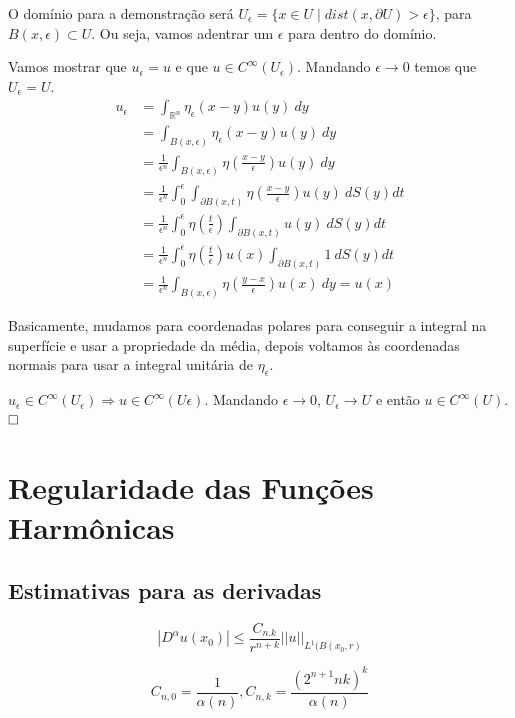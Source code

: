 \documentclass[11pt]{article}
\newcommand{\qed}{$\hfill\square$}
\newcommand{\Rn}{{\mathbb{R}^n}}
\newcommand{\p}{\partial}
\newcommand{\e}{\epsilon}
\begin{document}
O domínio para a demonstração será \( U_\e = \{x \in U \mid dist(x, \p U) > \e\} \), para \( B(x,\e) \subset U \). Ou seja, vamos adentrar um \( \e \) para dentro do domínio.

Vamos mostrar que \( u_\e=u \) e que \( u \in C^\infty(U_\e) \). Mandando \( \e \rightarrow 0 \) temos que \( U_\e = U \). \begin{align*}
	u_\e &= \int_{ \Rn } \eta_\e (x-y) u(y)\ dy \\
	&= \int_{B(x,\e)} \eta_\e (x-y) u(y)\ dy\\
	&= \frac{1}{\e^n} \int_{ B(x,\e) } \eta\left(\frac{x-y}{\e}\right) u(y)\ dy\\
	&= \frac{1}{\e^n} \int_0^\e \int_{ \p B(x,t) } \eta\left(\frac{x-y}{\e}\right) u(y)\ dS(y)dt\\
	&= \frac{1}{\e^n} \int_0^\e \eta\left(\frac{t}{\e}\right) \int_{ \p B(x,t) }  u(y)\ dS(y)dt\\
	&= \frac{1}{\e^n} \int_0^\e \eta\left(\frac{t}{\e}\right) u(x) \int_{ \p B(x,t) }  1\ dS(y)dt\\
	&= \frac{1}{\e^n} \int_{B(x,\e)} \eta\left(\frac{y-x}{\e}\right) u(x) \ dy = u(x)
\end{align*}

Basicamente, mudamos para coordenadas polares para conseguir a integral na superfície e usar a propriedade da média, depois voltamos às coordenadas normais para usar a integral unitária de \( \eta_\e \). 

\( u_\e \in C^\infty(U_\e) \Rightarrow u \in C^\infty(U\e)\). Mandando \( \e\rightarrow0 \), \( U_\e \rightarrow U \) e então \( u \in C^\infty(U) \).\qed











\section{Regularidade das Funções Harmônicas}
\subsection{Estimativas para as derivadas}

\[ | D^\alpha u(x_0) | \leq \frac{C_{n.k}}{r^{n+k}} || u ||_{L^1 (B(x_0, r)} \]

\[C_{n,0} = \frac{1}{\alpha (n)}, C_{n,k} = \frac{ (2^{n+1} nk)^k }{\alpha (n)}\]
\end{document}
